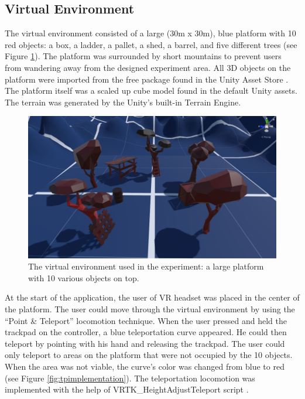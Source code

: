 \subsection{Virtual Environment}

The virtual environment consisted of a large (30m x 30m), blue platform with 10 red objects: a box, a ladder, a pallet, a shed, a barrel, and five different trees (see Figure \ref{fig:veimplementation}). The platform was surrounded by short mountains to prevent users from wandering away from the designed experiment area. All 3D objects on the platform were imported from the free package found in the Unity Asset Store \cite{POLYGONCITY}. The platform itself was a scaled up cube model found in the default Unity assets. The terrain was generated by the Unity's built-in Terrain Engine.

\begin{figure}[th]
\centering
\includegraphics[width=1\textwidth]{img/virtual_environment.png}
\caption{The virtual environment used in the experiment: a large platform with 10 various objects on top.}
\label{fig:veimplementation}
\end{figure}

At the start of the application, the user of VR headset was placed in the center of the platform. The user could move through the virtual environment by using the ``Point \& Teleport'' locomotion technique. When the user pressed and held the trackpad on the controller, a blue teleportation curve appeared. He could then teleport by pointing with his hand and releasing the trackpad. The user could only teleport to areas on the platform that were not occupied by the 10 objects. When the area was not viable, the curve's color was changed from blue to red (see Figure \ref{fig:tpimplementation}). The teleportation locomotion was implemented with the help of VRTK\_HeightAdjustTeleport script \cite{VRTK_TELEPORT}.

